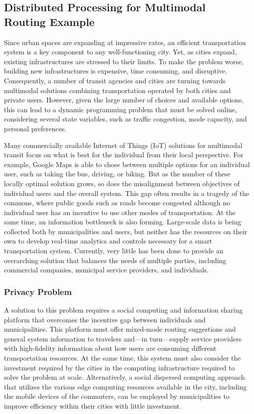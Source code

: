 \documentclass[12pt,letterpaper]{article}
\newcommand{\Aron}[1]{\todo[color=green!40, linecolor=black!50]{\textbf{Aron}: #1}}
\begin{document}
\subsection{Distributed Processing for Multimodal Routing Example}

Since urban spaces are expanding at impressive rates, an efficient transportation system is a key component to any well-functioning city. Yet, as cities expand, existing infrastructures are stressed to their limits. To make the problem worse,  building new infrastructures is expensive, time consuming, and disruptive. Consequently, a number of transit agencies and cities are turning towards multimodal  solutions combining transportation operated by both cities and private users. However, given the large number of choices and available options, this can lead to a %
dynamic programming problem that must be solved online, considering several state variables, such as traffic congestion, mode capacity, and personal preferences. 

Many commercially available Internet of Things (IoT) solutions for multimodal
transit focus on what is best for the individual from their local perspective. For example, Google Maps is able to chose between multiple options for an individual user, such as taking the bus, driving, or biking. But as the number of these locally optimal solution grows, so does the misalignment between objectives of individual users and the overall system. This gap often results in a tragedy of the commons, where public goods such as roads become congested although no individual user has an incentive to use other modes of transportation. At the same time, an information bottleneck is also forming. Large-scale data is being collected both by municipalities and users, but neither has the resources on their own to develop real-time analytics and controls necessary for a smart transportation system. Currently, very little has been done to provide an overarching solution that balances the needs of multiple parties, including commercial companies, municipal service providers, and individuals. 

\subsubsection{Privacy Problem}
A solution to this problem requires a social computing and information sharing platform that overcomes the incentive gap between individuals and municipalities. This platform must offer mixed-mode routing suggestions and general system information to travelers and---in turn---supply service providers with high-fidelity information about how users are consuming different transportation resources. At the same time, this system must also consider the investment required by the cities in the computing infrastructure required to solve the problem at scale. Alternatively, a social dispersed computing approach that utilizes the various edge computing resources available in the city, including the mobile devices of the commuters, can be employed by municipalities to improve efficiency within their cities with little investment.
\end{document}
